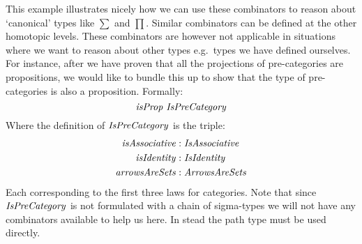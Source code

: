 This example illustrates nicely how we can use these combinators to
reason about `canonical' types like $∑$ and $∏$. Similar
combinators can be defined at the other homotopic levels. These
combinators are however not applicable in situations where we want to
reason about other types e.g.\ types we have defined ourselves. For
instance, after we have proven that all the projections of
pre-categories are propositions, we would like to bundle this up to
show that the type of pre-categories is also a proposition. Formally:
%
\begin{equation}
\label{eq:propIsPreCategory}
\isProp\ \IsPreCategory
\end{equation}
%
Where the definition of $\IsPreCategory$ is the triple:
%
\begin{align*}
\var{isAssociative} & \tp \var{IsAssociative}\\
\isIdentity    & \tp \var{IsIdentity}\\
\var{arrowsAreSets} & \tp \var{ArrowsAreSets}
\end{align*}
%
Each corresponding to the first three laws for categories. Note that
since $\IsPreCategory$ is not formulated with a chain of sigma-types
we will not have any combinators available to help us here. In stead
the path type must be used directly.


